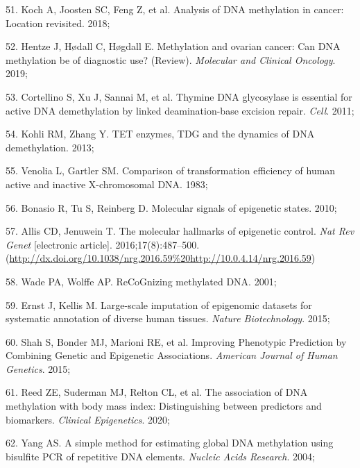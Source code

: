 \documentclass[11pt,oneside]{bristolthesis}
\newenvironment{cslreferences}%
  {}%
  {\par}
\begin{document}
\begin{cslreferences}
\leavevmode\hypertarget{ref-Koch2018}{}%
51. Koch A, Joosten SC, Feng Z, et al. Analysis of DNA methylation in cancer: Location revisited. 2018;

\leavevmode\hypertarget{ref-Hentze2019}{}%
52. Hentze J, Hødall C, Høgdall E. Methylation and ovarian cancer: Can DNA methylation be of diagnostic use? (Review). \emph{Molecular and Clinical Oncology}. 2019;

\leavevmode\hypertarget{ref-Cortellino2011}{}%
53. Cortellino S, Xu J, Sannai M, et al. Thymine DNA glycosylase is essential for active DNA demethylation by linked deamination-base excision repair. \emph{Cell}. 2011;

\leavevmode\hypertarget{ref-Kohli2013}{}%
54. Kohli RM, Zhang Y. TET enzymes, TDG and the dynamics of DNA demethylation. 2013;

\leavevmode\hypertarget{ref-Venolia1983}{}%
55. Venolia L, Gartler SM. Comparison of transformation efficiency of human active and inactive X-chromosomal DNA. 1983;

\leavevmode\hypertarget{ref-Bonasio2010}{}%
56. Bonasio R, Tu S, Reinberg D. Molecular signals of epigenetic states. 2010;

\leavevmode\hypertarget{ref-Allis2016}{}%
57. Allis CD, Jenuwein T. The molecular hallmarks of epigenetic control. \emph{Nat Rev Genet} {[}electronic article{]}. 2016;17(8):487--500. (\url{http://dx.doi.org/10.1038/nrg.2016.59\%20http://10.0.4.14/nrg.2016.59})

\leavevmode\hypertarget{ref-Wade2001}{}%
58. Wade PA, Wolffe AP. ReCoGnizing methylated DNA. 2001;

\leavevmode\hypertarget{ref-Ernst2015}{}%
59. Ernst J, Kellis M. Large-scale imputation of epigenomic datasets for systematic annotation of diverse human tissues. \emph{Nature Biotechnology}. 2015;

\leavevmode\hypertarget{ref-Shah2015}{}%
60. Shah S, Bonder MJ, Marioni RE, et al. Improving Phenotypic Prediction by Combining Genetic and Epigenetic Associations. \emph{American Journal of Human Genetics}. 2015;

\leavevmode\hypertarget{ref-Reed2020}{}%
61. Reed ZE, Suderman MJ, Relton CL, et al. The association of DNA methylation with body mass index: Distinguishing between predictors and biomarkers. \emph{Clinical Epigenetics}. 2020;

\leavevmode\hypertarget{ref-Yang2004}{}%
62. Yang AS. A simple method for estimating global DNA methylation using bisulfite PCR of repetitive DNA elements. \emph{Nucleic Acids Research}. 2004;


\end{cslreferences}
\end{document}
